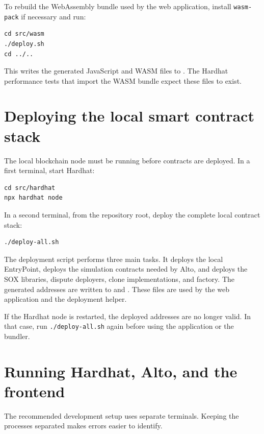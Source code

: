 To rebuild the WebAssembly bundle used by the web application, install \texttt{wasm-pack}
if necessary and run:

\begin{verbatim}
cd src/wasm
./deploy.sh
cd ../..
\end{verbatim}

This writes the generated JavaScript and WASM files to
. The Hardhat performance tests that import the WASM bundle
expect these files to exist.

\section{Deploying the local smart contract stack}

The local blockchain node must be running before contracts are deployed. In a first
terminal, start Hardhat:

\begin{verbatim}
cd src/hardhat
npx hardhat node
\end{verbatim}

In a second terminal, from the repository root, deploy the complete local contract stack:

\begin{verbatim}
./deploy-all.sh
\end{verbatim}

The deployment script performs three main tasks. It deploys the local EntryPoint, deploys
the simulation contracts needed by Alto, and deploys the SOX libraries, dispute deployers,
clone implementations, and factory. The generated addresses are written to
 and . These files are used
by the web application and the deployment helper.

If the Hardhat node is restarted, the deployed addresses are no longer valid. In that case,
run \texttt{./deploy-all.sh} again before using the application or the bundler.

\section{Running Hardhat, Alto, and the frontend}

The recommended development setup uses separate terminals. Keeping the processes separated
makes errors easier to identify.

